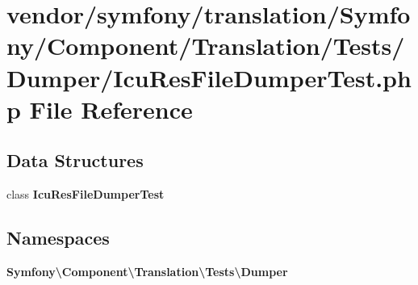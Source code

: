 \section{vendor/symfony/translation/\+Symfony/\+Component/\+Translation/\+Tests/\+Dumper/\+Icu\+Res\+File\+Dumper\+Test.php File Reference}
\label{_icu_res_file_dumper_test_8php}
\subsection*{Data Structures}
\begin{DoxyCompactItemize}
\item 
class {\bf Icu\+Res\+File\+Dumper\+Test}
\end{DoxyCompactItemize}
\subsection*{Namespaces}
\begin{DoxyCompactItemize}
\item 
 {\bf Symfony\textbackslash{}\+Component\textbackslash{}\+Translation\textbackslash{}\+Tests\textbackslash{}\+Dumper}
\end{DoxyCompactItemize}
